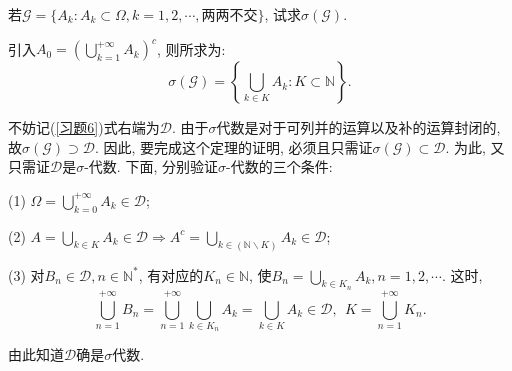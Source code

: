 \begin{yyEx}
	若$\mathscr{G} = \{A_k:A_k\subset\Omega,k=1,2,\cdots,\text{两两不交}\}$, 试求$\sigma(\mathscr{G})$.
\end{yyEx}
	\begin{yySolution}
	引入$A_0 = \left(\bigcup\limits_{k=1}^{+\infty}A_k\right)^c$, 则所求为:
	\begin{equation}\label{习题6}
	\sigma(\mathscr{G}) = \left\{ \bigcup_{k\in K}A_{k}:K\subset\mathbb{N} \right\}.
	\end{equation}
	\begin{yyProof}
		不妨记(\ref{习题6})式右端为$\mathscr{D}$. 由于$\sigma$代数是对于可列并的运算以及补的运算封闭的, 故$\sigma(\mathscr{G}) \supset \mathscr{D}$. 因此, 要完成这个定理的证明, 必须且只需证$\sigma(\mathscr{G}) \subset \mathscr{D}$. 为此, 又只需证$\mathscr{D}$是$\sigma$-代数. 下面, 分别验证$\sigma$-代数的三个条件:
		\begin{blist}
			\item[(1)] $\Omega = \bigcup\limits_{k=0}^{+\infty}A_k \in \mathscr{D}$;
			\item[(2)] $A = \bigcup\limits_{k\in K}A_{k}\in \mathscr{D} \Rightarrow A^c = \bigcup\limits_{k\in (\mathbb{N}\backslash K)}A_{k} \in\mathscr{D}$;
			\item[(3)] 对$B_n\in\mathscr{D},n\in\mathbb{N}^*$, 有对应的$K_n\in\mathbb{N}$, 使$
			B_n = \bigcup_{k\in K_n}A_{k}, n=1,2,\cdots$.
			这时,\begin{equation}
			\bigcup_{n=1}^{+\infty}B_n = \bigcup_{n=1}^{+\infty}\bigcup_{k\in K_n}A_{k} = \bigcup_{k\in K}A_{k}\in\mathscr{D},~~K = \bigcup_{n=1}^{+\infty}K_n.
			\end{equation}
		\end{blist}
		由此知道$\mathscr{D}$确是$\sigma$代数.
	\end{yyProof}
\end{yySolution}




